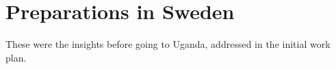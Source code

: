 \section{Preparations in Sweden}

These were the insights before going to Uganda, addressed in the initial work plan.





